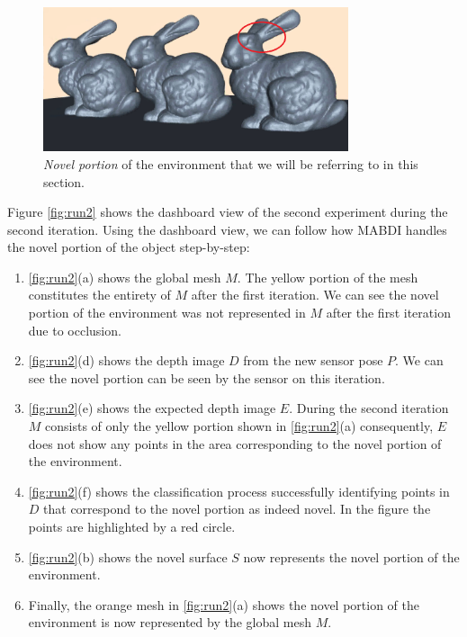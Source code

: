 \begin{figure}[h]%
\centering
  \includegraphics[width=0.8\textwidth]{figures/run2_novel_portion.png}
  \caption{\emph{Novel portion} of the environment that we will be referring to
  in this section.}
  \label{fig:run2_novel_portion}
\end{figure}

Figure \ref{fig:run2} shows the dashboard view of the second experiment during
the second iteration. Using the dashboard view, we can follow how MABDI handles
the novel portion of the object step-by-step:
\begin{enumerate}
  \item \ref{fig:run2}(a) shows the global mesh $M$. The yellow portion of the
  mesh constitutes the entirety of $M$ after the first iteration. We can see the
  novel portion of the environment was not represented in $M$ after the first
  iteration due to occlusion.
  \item \ref{fig:run2}(d) shows the depth image $D$ from the new sensor pose
  $P$. We can see the novel portion can be seen by the sensor on this iteration.
  \item \ref{fig:run2}(e) shows the expected depth image $E$. During the second
  iteration $M$ consists of only the yellow portion shown in \ref{fig:run2}(a)
  consequently, $E$ does not show any points in the area corresponding to the
  novel portion of the environment.
  \item \ref{fig:run2}(f) shows the classification process successfully
  identifying points in $D$ that correspond to the novel portion as indeed
  novel. In the figure the points are highlighted by a red circle.
  \item \ref{fig:run2}(b) shows the novel surface $S$ now represents the novel
  portion of the environment.
  \item Finally, the orange mesh in \ref{fig:run2}(a) shows the novel portion of
  the environment is now represented by the global mesh $M$.
\end{enumerate}

